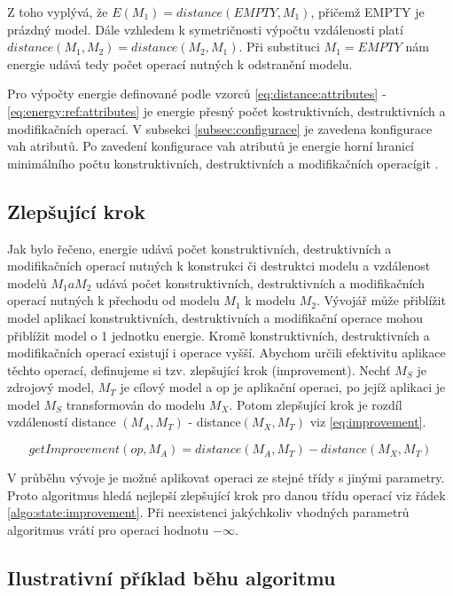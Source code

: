 \documentclass[11pt,twoside,a4paper]{book}
\begin{document}
Z toho vyplývá, že $E(M_1) = distance(EMPTY, M_1)$, přičemž EMPTY je prázdný
model. Dále vzhledem k symetričnosti výpočtu vzdálenosti platí $distance(M_1,
M_2) = distance(M_2, M_1)$. Při substituci $M_1 = EMPTY$ nám energie udává tedy
počet operací nutných k odstranění modelu.

Pro výpočty energie definované podle vzorců \eqref{eq:distance:attributes} -
\eqref{eq:energy:ref:attributes} je energie přesný počet kostruktivních,
destruktivních a modifikačních operací. V subsekci \ref{subsec:configurace} je
zavedena konfigurace vah atributů. Po zavedení konfigurace vah atributů je
energie horní hranicí minimálního počtu konstruktivních, destruktivních a
modifikačních operacígit .

\subsection{Zlepšující krok}
Jak bylo řečeno, energie udává počet konstruktivních, destruktivních a
modifikačních operací nutných k konstrukci či destruktci modelu a vzdálenost
modelů $M_1 a M_2$ udává počet konstruktivních, destruktivních a
modifikačních operací nutných k přechodu od modelu $M_1$ k modelu $M_2$.
Vývojář může přiblížit model aplikací konstruktivních, destruktivních a
modifikační operace mohou přiblížit model o 1 jednotku energie. Kromě
konstruktivních, destruktivních a modifikačních operací existují i operace
vyšší. Abychom určili efektivitu aplikace těchto operací, definujeme si tzv.
zlepšující krok (improvement). Nechť $M_S$ je zdrojový model,
$M_T$ je cílový model a op je aplikační operaci, po jejíž aplikaci je model
$M_S$ transformován do modelu $M_X$. Potom zlepšující krok je rozdíl vzdáleností
distance $(M_A, M_T)$ - distance$(M_X, M_T)$ viz \eqref{eq:improvement}.

\begin{equation}
getImprovement(op, M_A) = distance(M_A, M_T) - distance(M_X, M_T)
\label{eq:improvement}\end{equation}


V průběhu vývoje je možné aplikovat operaci ze stejné třídy s jinými parametry.
Proto algoritmus hledá nejlepší zlepšující krok pro danou třídu operací viz
řádek \ref{algo:state:improvement}. Při neexistenci jakýchkoliv vhodných
parametrů algoritmus vrátí pro operaci hodnotu $-\infty$.


\subsection{Ilustrativní příklad běhu algoritmu}
\end{document}
